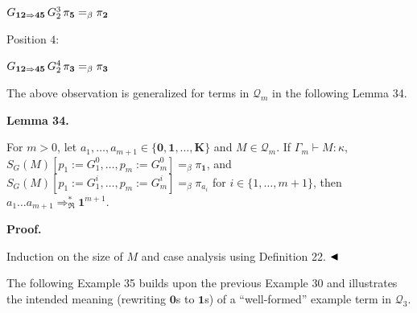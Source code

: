 \documentclass[10pt,a4paper]{amsart}
\begin{document}
$G_{\mathbf{1}\mathbf{2}\Rightarrow\mathbf{4}\mathbf{5}}\,G_{2}^{3}\,\pi_{%
\mathbf{5}}=_{\beta}\pi_{\mathbf{2}}$\par
 
  Position $4$:  
 
$G_{\mathbf{1}\mathbf{2}\Rightarrow\mathbf{4}\mathbf{5}}\,G_{2}^{4}\,\pi_{%
\mathbf{3}}=_{\beta}\pi_{\mathbf{3}}$\par
 
   
 
 
 
The above observation is generalized for terms in $\mathcal{Q}_{m}$ in the following Lemma 34.\par
 
 
 
\par\medskip\noindent\textbf{Lemma 34.}\par
 
 
For $m>0$, let $a_{1},\ldots,a_{m+1}\in\{\mathbf{0},\mathbf{1},\ldots,\mathbf{K}\}$ and $M\in\mathcal{Q}_{m}$. If $\Gamma_{m}\vdash M:\kappa$, $S_{G}(M)[p_{1}:=G_{1}^{0},\ldots,p_{m}:=G_{m}^{0}]=_{\beta}\pi_{\mathbf{1}}$, and $S_{G}(M)[p_{1}:=G_{1}^{i},\ldots,p_{m}:=G_{m}^{i}]=_{\beta}\pi_{a_{i}}$ for $i\in\{1,\ldots,m+1\}$, then $a_{1}\ldots a_{m+1}\Rightarrow_{\mathfrak{R}}^{*}\mathbf{1}^{m+1}$.\par
 
 
 
 
\par\medskip\noindent\textbf{Proof.}\par
 
 
Induction on the size of $M$ and case analysis using Definition 22. $\hfill\blacktriangleleft$\par
 
 
 
The following Example 35 builds upon the previous Example 30 and illustrates the intended meaning (rewriting $\mathbf{0}$s to $\mathbf{1}$s) of a “well-formed” example term in $\mathcal{Q}_{3}$.\par
 
\end{document}

